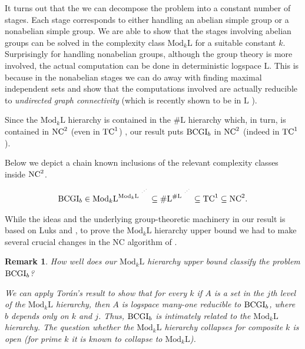\documentclass[11pt]{article}
\newtheorem*{remark}{Remark}
\newcommand{\Mod}[1]{\ensuremath{\mathrm{Mod}_{#1}\mathrm{L}}}
\newcommand{\Lo}{\ensuremath{\mathrm{L}}}
\newcommand{\NC}{\mbox{\rm NC}}
\newcommand{\TC}{\mbox{\rm TC}}
\newcommand{\NCtwo}{\ensuremath{\NC^2}}
\newcommand{\TCone}{\ensuremath{\TC^1}}
\newcommand{\BCGI}{\mbox{\rm BCGI}}
\begin{document}
It turns out that the we can decompose the problem into a constant
number of stages. Each stage corresponds to either handling an abelian
simple group or a nonabelian simple group. We are able to show that
the stages involving abelian groups can be solved in the complexity
class $\Mod{k}$ for a suitable constant $k$. Surprisingly for handling
nonabelian groups, although the group theory is more involved, the
actual computation can be done in deterministic logspace $\Lo$. This
is because in the nonabelian stages we can do away with finding
maximal independent sets and show that the computations involved are
actually reducible to \emph{undirected graph connectivity} (which is
recently shown to be in $\Lo$ \cite{rein}).

Since the $\Mod{k}$ hierarchy is contained in the $\#\Lo$ hierarchy
which, in turn, is contained in $\NCtwo$ (even in $\TCone$)
\cite{allender99complexity}, our result puts $\BCGI_b$ in $\NCtwo$
(indeed in $\TCone$).

Below we depict a chain known inclusions of the relevant complexity
classes inside $\NCtwo$.

\begin{eqnarray*}
\BCGI_b\in\Mod{k}^{\Mod{k}^{~^{\cdot^{\cdot^{\cdot}}}}}\subseteq  
\#\Lo^{\#\Lo^{~^{\cdot^{\cdot^{\cdot}}}}}\subseteq  
\TCone \subseteq \NCtwo.
\end{eqnarray*}

While the ideas and the underlying group-theoretic machinery in our
result is based on Luks \cite{luks} and \cite{LM}, to prove the
$\Mod{k}$ hierarchy upper bound we had to make several crucial
changes in the NC algorithm of \cite{luks}.


\begin{remark}
How well does our $\Mod{k}$ hierarchy upper bound classify the problem
$\BCGI_b$? 

We can apply Tor\'an's result \cite[Lemma 4.7]{tor} to show that for
every $k$ if $A$ is a set in the $j$th level of the $\Mod{k}$
hierarchy, then $A$ is logspace many-one reducible to $\BCGI_b$, where
$b$ depends only on $k$ and $j$. Thus, $\BCGI_b$ is intimately related
to the $\Mod{k}$ hierarchy. The question whether the $\Mod{k}$
hierarchy collapses for composite $k$ is open (for prime $k$ it
is known to collapse to $\Mod{k}$). 
\end{remark}
\end{document}
